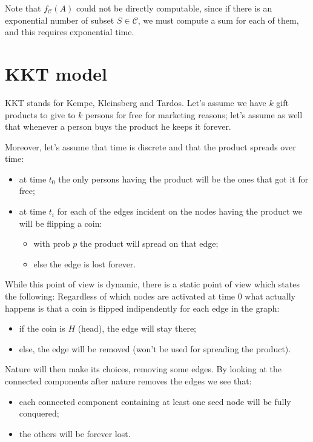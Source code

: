 \begin{obs}
    Note that $f_\mathscr{C}(A)$ could not be directly computable, since if there is an exponential number of subset $S \in \mathscr{C}$, we must compute a sum for each of them, and this requires exponential time.
\end{obs}


\section{KKT model}\label{sec:ktt}

KKT stands for Kempe, Kleinsberg and Tardos.
Let's assume we have $k$ gift products to give to $k$ persons for free for marketing reasons; let's assume as well that whenever a person buys the product he keeps it forever.

Moreover, let's assume that time is discrete and that the product spreads over time:
\begin{itemize}
    \item at time $t_0$ the only persons having the product will be the ones that got it for free;
    \item at time $t_i$ for each of the edges incident on the nodes having the product we will be flipping a coin:
    \begin{itemize}
        \item with prob $p$ the product will spread on that edge;
        \item else the edge is lost forever.
    \end{itemize}  
\end{itemize} 

While this point of view is dynamic, there is a static point of view which states the following:
Regardless of which nodes are activated at time 0 what actually happens is that a coin is flipped indipendently for each edge in the graph:
%
\begin{itemize}
    \item if the coin is $H$ (head), the edge will stay there;
    \item else, the edge will be removed (won't be used for spreading the product).
\end{itemize}
%
Nature will then make its choices, removing some edges. 
By looking at the connected components after nature removes the edges we see that:
%
\begin{itemize}
    \item each connected component containing at least one seed node will be fully conquered;
    \item the others will be forever lost.
\end{itemize}

